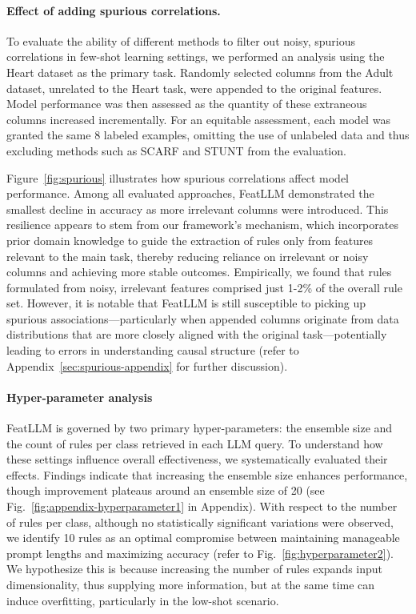 \vspace*{-0.12in}
\paragraph{Effect of adding spurious correlations.} To evaluate the ability of different methods to filter out noisy, spurious correlations in few-shot learning settings, we performed an analysis using the Heart dataset as the primary task. Randomly selected columns from the Adult dataset, unrelated to the Heart task, were appended to the original features. Model performance was then assessed as the quantity of these extraneous columns increased incrementally. For an equitable assessment, each model was granted the same 8 labeled examples, omitting the use of unlabeled data and thus excluding methods such as SCARF and STUNT from the evaluation.

Figure~\ref{fig:spurious} illustrates how spurious correlations affect model performance. Among all evaluated approaches, \textsf{FeatLLM} demonstrated the smallest decline in accuracy as more irrelevant columns were introduced. This resilience appears to stem from our framework’s mechanism, which incorporates prior domain knowledge to guide the extraction of rules only from features relevant to the main task, thereby reducing reliance on irrelevant or noisy columns and achieving more stable outcomes. Empirically, we found that rules formulated from noisy, irrelevant features comprised just 1-2\% of the overall rule set. However, it is notable that \textsf{FeatLLM} is still susceptible to picking up spurious associations—particularly when appended columns originate from data distributions that are more closely aligned with the original task—potentially leading to errors in understanding causal structure (refer to Appendix~\ref{sec:spurious-appendix} for further discussion).

\vspace*{-0.12in}
\paragraph{Hyper-parameter analysis}
\textsf{FeatLLM} is governed by two primary hyper-parameters: the ensemble size and the count of rules per class retrieved in each LLM query. To understand how these settings influence overall effectiveness, we systematically evaluated their effects. Findings indicate that increasing the ensemble size enhances performance, though improvement plateaus around an ensemble size of 20 (see Fig.~\ref{fig:appendix-hyperparameter1} in Appendix). With respect to the number of rules per class, although no statistically significant variations were observed, we identify 10 rules as an optimal compromise between maintaining manageable prompt lengths and maximizing accuracy (refer to Fig.~\ref{fig:hyperparameter2}). We hypothesize this is because increasing the number of rules expands input dimensionality, thus supplying more information, but at the same time can induce overfitting, particularly in the low-shot scenario.

